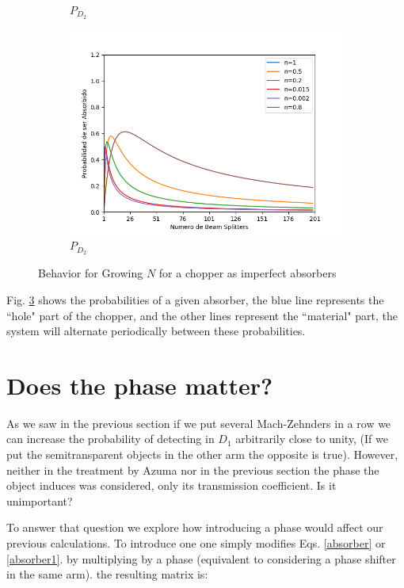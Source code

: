 \documentclass{book}
\begin{document}
\begin{figure}[!htb]
\begin{subfigure}[b]{0.3\linewidth}
\caption{$P_{D_{2}}$}
\label{fig:westminster_aerea}
\end{subfigure}
\begin{subfigure}[b]{0.3\linewidth}
\includegraphics[width=\linewidth]{images/Chopper_abs.png}
\caption{$P_{D_{2}}$}
\label{fig:BS1}
\end{subfigure}
\caption{Behavior for Growing $N$ for a chopper as imperfect absorbers}
\label{fig:several_chpper}
\end{figure}
 

Fig. \ref{fig:several_chpper} shows the probabilities of a given absorber, the blue line represents the ``hole" part of the chopper, and the other lines represent the ``material" part, the system will alternate periodically between these probabilities.

\section{Does the phase matter?}

As we saw in the previous section if we put several Mach-Zehnders in a row we can increase the probability of detecting in $D_{1}$ arbitrarily close to unity, (If we put the semitransparent objects in the other arm the opposite is true). However, neither in the treatment by Azuma \cite{Azuma} nor in the previous section the phase the object induces was considered, only its transmission coefficient. Is it unimportant?

To answer that question we explore how introducing a phase would affect our previous calculations. To introduce one one simply modifies Eqs. \ref{absorber} or \ref{absorber1}. by multiplying by a phase (equivalent to considering a phase shifter in the same arm). the resulting matrix is:
\end{document}
